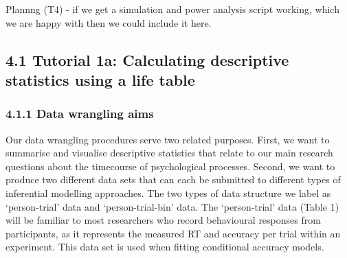 \documentclass[
  man,floatsintext]{apa6}
\begin{document}
Plannng (T4) - if we get a simulation and power analysis script working, which we are happy with then we could include it here.

\subsection{4.1 Tutorial 1a: Calculating descriptive statistics using a life table}\label{tutorial-1a-calculating-descriptive-statistics-using-a-life-table}

\subsubsection{4.1.1 Data wrangling aims}\label{data-wrangling-aims}

Our data wrangling procedures serve two related purposes. First, we want to summarise and visualise descriptive statistics that relate to our main research questions about the timecourse of psychological processes. Second, we want to produce two different data sets that can each be submitted to different types of inferential modelling approaches. The two types of data structure we label as `person-trial' data and `person-trial-bin' data. The `person-trial' data (Table 1) will be familiar to most researchers who record behavioural responses from participants, as it represents the measured RT and accuracy per trial within an experiment. This data set is used when fitting conditional accuracy models.
\end{document}

